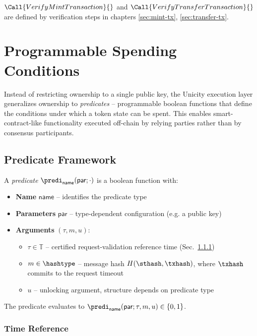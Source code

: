 $\Call{VerifyMintTransaction}{}$ and $\Call{VerifyTransferTransaction}{}$ are defined by verification steps in chapters \ref{sec:mint-tx}, \ref{sec:transfer-tx}.

\section{Programmable Spending Conditions}\label{sec:predicates}

Instead of restricting ownership to a single public key, the Unicity execution layer generalizes ownership to \emph{predicates} -- programmable boolean functions that define the conditions under which a token state can be spent. This enables smart-contract-like functionality executed off-chain by relying parties rather than by consensus participants.

\subsection{Predicate Framework}\label{sec:predicate-framework}

A \emph{predicate} $\predi_\mathsf{name}(\mathsf{par}; \cdot)$ is a boolean function with:
\begin{itemize}
	\item \textbf{Name} $\mathsf{name}$ -- identifies the predicate type
	\item \textbf{Parameters} $\mathsf{par}$ -- type-dependent configuration (e.g. a public key)
	\item \textbf{Arguments} $(\tau, m, u)$:
	\begin{itemize}
		\item $\tau \in \mathbb{T}$ -- certified request-validation reference time (Sec.~\ref{sec:time-extraction})
		\item $m \in \hashtype$ -- message hash $H(\sthash, \txhash)$, where $\txhash$ commits to the request timeout
		\item $u$ -- unlocking argument, structure depends on predicate type
	\end{itemize}
\end{itemize}

The predicate evaluates to $\predi_\mathsf{name}(\mathsf{par}; \tau, m, u) \in \{0, 1\}$.


\subsubsection{Time Reference}\label{sec:time-extraction}

